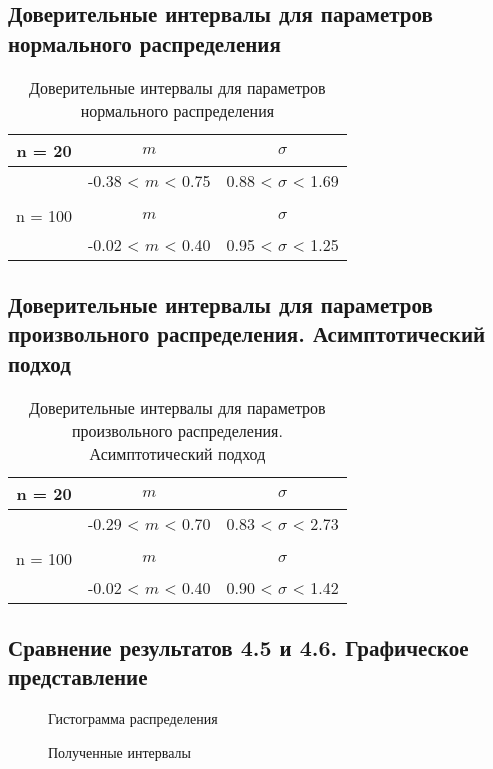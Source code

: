 \subsection{Доверительные интервалы для параметров нормального распределения}
\begin{table}[H]
	\centering
	\begin{tabular}{| c | c | c |}
		\hline
		n = 20   &  $m$  & $\sigma$\\ \hline
		&  -0.38 < $m$ < 0.75 & 0.88 < $\sigma$ < 1.69 \\ \hline
		&   &   \\ \hline
		n = 100   &  $m$  & $\sigma$\\ \hline
		& -0.02 < $m$ < 0.40 & 0.95 < $\sigma$ < 1.25 \\
		\hline
	\end{tabular}
	\caption{Доверительные интервалы для параметров нормального распределения}
	\label{tab:interv_simple}
\end{table}

\subsection{Доверительные интервалы для параметров произвольного распределения. Асимптотический подход}
\begin{table}[H]
	\centering
	\begin{tabular}{| c | c | c |}
		\hline
		n = 20   &  $m$  & $\sigma$\\ \hline
		&  -0.29 < $m$ < 0.70 & 0.83 < $\sigma$ < 2.73 \\ \hline
		&   &   \\ \hline
		n = 100   &  $m$  & $\sigma$\\ \hline
		& -0.02 < $m$ < 0.40 & 0.90 < $\sigma$ < 1.42 \\
		\hline
	\end{tabular}
	\caption{Доверительные интервалы для параметров произвольного распределения. Асимптотический подход}
	\label{tab:interv_asimpt}
\end{table}

\subsection{Сравнение результатов 4.5 и 4.6. Графическое представление}
\begin{figure}[H]
	\caption{Гистограмма распределения}
	\label{fig:hist}
\end{figure}
\begin{figure}[H]
	\caption{Полученные интервалы}
	\label{fig:intervals}
\end{figure}